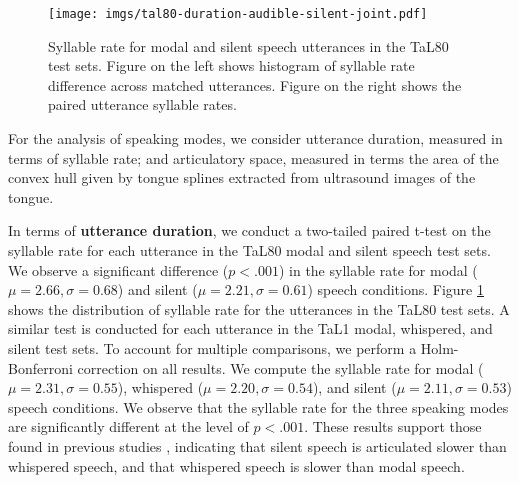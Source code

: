 \documentclass[a4paper]{article}
\begin{document}
\begin{figure}[t]
  \centering
  \texttt{[image: imgs/tal80-duration-audible-silent-joint.pdf]}
  \caption{Syllable rate for modal and silent speech utterances in the TaL80 test sets. Figure on the left shows histogram of syllable rate difference across matched utterances. Figure on the right shows the paired utterance syllable rates.}
  \label{fig:syl-rate-hist-scatter}
\end{figure}

For the analysis of speaking modes, we consider utterance duration, measured in terms of syllable rate; and articulatory space, measured in terms the area of the convex hull given by tongue splines extracted from ultrasound images of the tongue.

In terms of \textbf{utterance duration}, we conduct a two-tailed paired t-test on the syllable rate for each utterance in the TaL80 modal and silent speech test sets.
We observe a significant difference ($p < .001$) in the syllable rate for modal ($\mu=2.66, \sigma=0.68$) and silent ($\mu=2.21, \sigma=0.61$) speech conditions.
Figure \ref{fig:syl-rate-hist-scatter} shows the distribution of syllable rate for the utterances in the TaL80 test sets.
A similar test is conducted for each utterance in the TaL1 modal, whispered, and silent test sets.
To account for multiple comparisons, we perform a Holm-Bonferroni correction on all results.
We compute the syllable rate for modal ($\mu=2.31, \sigma=0.55$), whispered ($\mu=2.20, \sigma=0.54$), and silent ($\mu=2.11, \sigma=0.53$) speech conditions.
We observe that the syllable rate for the three speaking modes are significantly different at the level of $p < .001$.
These results support those found in previous studies \cite{dromey2017effects, teplansky2019tongue, teplansky2020tongue, crevier2011articulatory}, indicating that silent speech is articulated slower than whispered speech, and that whispered speech is slower than modal speech.
\end{document}
